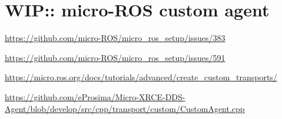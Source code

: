 \documentclass[10pt]{article}
\begin{document}


  

\section{WIP:: micro-ROS custom agent}

\url{https://github.com/micro-ROS/micro_ros_setup/issues/383}

\url{https://github.com/micro-ROS/micro_ros_setup/issues/591}

\url{https://micro.ros.org/docs/tutorials/advanced/create_custom_transports/}

\url{https://github.com/eProsima/Micro-XRCE-DDS-Agent/blob/develop/src/cpp/transport/custom/CustomAgent.cpp}



\end{document}
